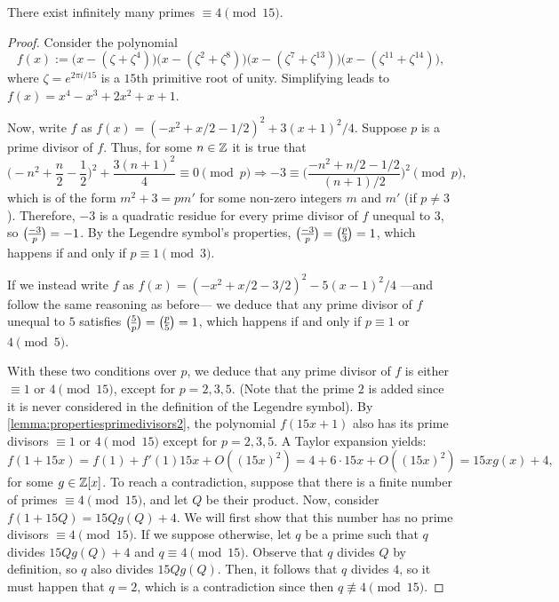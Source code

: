 \documentclass[../main.tex]{subfiles}
\begin{document}
\begin{proposition}\label{prop:Murtyexample}
	There exist infinitely many primes $\equiv 4\pmod{15}$.
\end{proposition}
\begin{proof}
	Consider the polynomial
	\begin{equation*}
		f(x):=\big(x-(\zeta+\zeta^4)\big)\big(x-(\zeta^2+\zeta^8)\big)\big(x-(\zeta^7+\zeta^{13})\big)(x-(\zeta^{11}+\zeta^{14})\big),
	\end{equation*}
	where $\zeta=e^{2\pi i/15}$ is a $15$th primitive root of unity. Simplifying leads to $f(x)=x^4-x^3+2x^2+x+1$.
	
	Now, write $f$ as $f(x)=(-x^2+x/2-1/2)^2+3(x+1)^2/4$. Suppose $p$ is a prime divisor of $f$. Thus, for some $n\in \mathbb{Z}$ it is true that
	\begin{equation*}
		\bigg(-n^2+\frac{n}{2}-\frac{1}{2}\bigg)^2+\frac{3(n+1)^2}{4}\equiv0 \pmod{p} \Rightarrow -3 \equiv \Bigg(\frac{-n^2+n/2-1/2}{(n+1)/2}\Bigg)^2 \pmod{p},
	\end{equation*}
	which is of the form $m^2+3=pm'$ for some non-zero integers $m$ and $m'$ (if $p\neq3$). Therefore, $-3$ is a quadratic residue for every prime divisor of $f$ unequal to $3$, so $\legendre{-3}{p}=-1$. By the Legendre symbol's properties, $\legendre{-3}{p}=\legendre{p}{3}=1$, which happens if and only if $p\equiv 1\pmod{3}$. 
	
	If we instead write $f$ as $f(x)=(-x^2+x/2-3/2)^2-5(x-1)^2/4$ ---and follow the same reasoning as before--- we deduce that any prime divisor of $f$ unequal to $5$ satisfies $\legendre{5}{p}=\legendre{p}{5}=1$, which happens if and only if $p\equiv 1$ or $4 \pmod{5}$.
	
	With these two conditions over $p$, we deduce that any prime divisor of $f$ is either $\equiv 1$ or $4 \pmod{15}$, except for $p=2,3,5$. (Note that the prime $2$ is added since it is never considered in the definition of the Legendre symbol). By \cref{lemma:propertiesprimedivisors2}, the polynomial $f(15x+1)$ also has its prime divisors $\equiv 1$ or $4 \pmod{15}$ except for $p=2,3,5$. A Taylor expansion yields:
	\begin{equation*}
		f(1+15x)=f(1)+f'(1)15x+O((15x)^2)=4+6\cdot15x+O((15x)^2)=15xg(x)+4,
	\end{equation*} 
	for some $g\in\mathbb{Z}[x]$. To reach a contradiction, suppose that there is a finite number of primes $\equiv 4\pmod{15}$, and let $Q$ be their product. Now, consider $f(1+15Q)=15Qg(Q)+4$. We will first show that this number has no prime divisors $\equiv 4 \pmod{15}$. If we suppose otherwise, let $q$ be a prime such that $q$ divides $15Qg(Q)+4$ and $q\equiv 4 \pmod{15}$. Observe that $q$ divides $Q$ by definition, so $q$ also divides $15Qg(Q)$. Then, it follows that $q$ divides $4$, so it must happen that $q=2$, which is a contradiction since then $q\not\equiv 4 \pmod{15}$. 
	

\end{proof}
\end{document}
